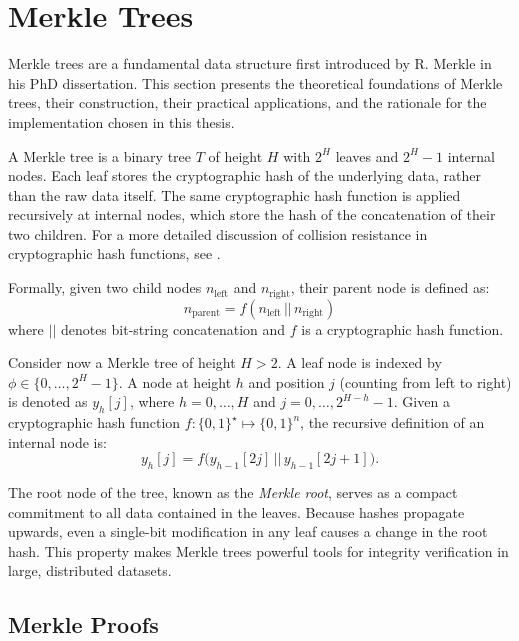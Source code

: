 \section{Merkle Trees}\label{section:merkle-trees}

Merkle trees \cite{merkle1979} are a fundamental data structure first introduced by R. Merkle in his PhD dissertation. This section presents the theoretical foundations of Merkle trees, their construction, their practical applications, and the rationale for the implementation chosen in this thesis.

A Merkle tree is a binary tree $T$ of height $H$ with $2^H$ leaves and $2^H - 1$ internal nodes.  
Each leaf stores the cryptographic hash of the underlying data, rather than the raw data itself. The same cryptographic hash function is applied recursively at internal nodes, which store the hash of the concatenation of their two children. For a more detailed discussion of collision resistance in cryptographic hash functions, see \cite{damgaard1987collision}.

Formally, given two child nodes $n_{\text{left}}$ and $n_{\text{right}}$, their parent node is defined as:
\begin{equation}
\label{equation:nparent}
    n_{\text{parent}} = f(n_{\text{left}} \, || \, n_{\text{right}})
\end{equation}
where $||$ denotes bit-string concatenation and $f$ is a cryptographic hash function.

Consider now a Merkle tree of height $H > 2$. A leaf node is indexed by $\phi \in \{0, \ldots, 2^H-1\}$. A node at height $h$ and position $j$ (counting from left to right) is denoted as $y_h[j]$, where $h = 0, \ldots, H$ and $j = 0, \ldots, 2^{H-h}-1$.  
Given a cryptographic hash function $f: \{0,1\}^\star \mapsto \{0,1\}^n$, the recursive definition of an internal node is:
\begin{equation}
    y_h[j] = f\big(y_{h-1}[2j] \, || \, y_{h-1}[2j+1]\big).
\end{equation}

The root node of the tree, known as the \emph{Merkle root}, serves as a compact commitment to all data contained in the leaves. Because hashes propagate upwards, even a single-bit modification in any leaf causes a change in the root hash. This property makes Merkle trees powerful tools for integrity verification in large, distributed datasets.


\subsection{Merkle Proofs}

